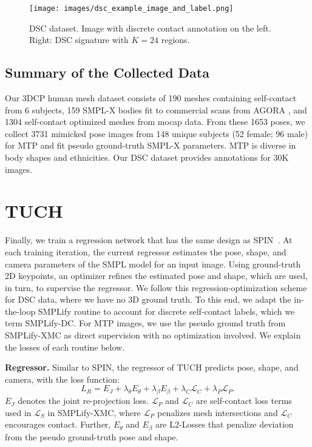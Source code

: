 \documentclass[final]{cvpr}
\newcommand{\mtp}{\mbox{MTP}\xspace}
\newcommand{\dsc}{\mbox{DSC}\xspace}
\newcommand{\smplifyxmc}{\mbox{SMPLify-XMC}\xspace}
\newcommand{\smplifyxdc}{\mbox{SMPLify-DC}\xspace}
\theoremstyle{definition}
\begin{document}
\begin{figure}
\centerline{		\texttt{[image: images/dsc\_example\_image\_and\_label.png]} }
\vspace{-0.04in}
	\caption{DSC dataset. Image with discrete contact annotation on the left. Right: DSC signature with $K=24$ regions.}
	\label{fig:DFExamples}
\end{figure}

\subsection{Summary of the Collected Data}
Our 3DCP human mesh dataset consists of 190 meshes containing self-contact from 6 subjects, 159 SMPL-X bodies fit to commercial scans from AGORA \cite{patel2021agora}, and 1304 self-contact optimized meshes from mocap data. From these 1653 poses, we collect 3731 mimicked pose images from 148 unique subjects (52 female; 96 male) for MTP and fit pseudo ground-truth SMPL-X parameters. MTP is diverse in body shapes and ethnicities. Our DSC dataset provides annotations for 30K images.















 	\section{TUCH}
\label{sec:tuch}
Finally, we train a regression network that has the same design as SPIN~\cite{kolotouros2019learning}. At each training iteration, the current regressor estimates the pose, shape, and camera parameters of the SMPL model for an input image. 
Using ground-truth 2D keypoints, an optimizer refines the estimated pose and shape, which are used, in turn, to supervise the  regressor.
We follow this regression-optimization scheme for \dsc data, where we have no 3D ground truth. 
To this end, we adapt the in-the-loop SMPLify routine to account for discrete self-contact labels, which we term \smplifyxdc.
For \mtp images, we use the pseudo ground truth from \smplifyxmc as direct supervision with no optimization involved.
We explain the losses of each routine below.

\textbf{Regressor.} Similar to SPIN, the regressor of TUCH predicts pose, shape, and camera, with the loss function:
\begin{equation}
L_R = E_J + \lambda_{\theta} E_{\theta} + \lambda_{\beta} E_{\beta} + \lambda_{C} \mathcal{L}_{C} + \lambda_{P} \mathcal{L}_{P} \text{.}
\end{equation}
$E_J$ denotes the joint re-projection loss. $\mathcal{L}_{P}$ and $\mathcal{L}_{C}$ are self-contact loss terms used in $\mathcal{L}_{S}$ in \smplifyxmc, where $\mathcal{L}_{P}$ penalizes mesh intersections and $\mathcal{L}_{C}$ encourages contact. Further, $E_{\theta}$ and $E_{\beta}$ are L2-Losses that penalize deviation from the pseudo ground-truth pose and shape.
\end{document}
